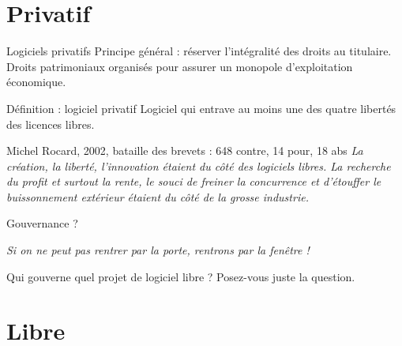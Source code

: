 \documentclass{beamer}
\begin{document}

\section{Privatif}


\begin{frame}{Logiciels privatifs}
  Principe général : réserver l'intégralité des droits au titulaire. Droits patrimoniaux organisés pour assurer un monopole d'exploitation économique.

  \begin{alertblock}{Définition : logiciel privatif}
    Logiciel qui entrave au moins une des quatre libertés des licences libres.    
  \end{alertblock}

\pause

  \begin{block}{Michel Rocard, 2002, bataille des brevets : 648 contre, 14 pour, 18 abs}
   \textit{ La création, la liberté, l'innovation étaient du côté des logiciels libres. La recherche du profit et surtout la rente, le souci de freiner la concurrence et d'étouffer le buissonnement extérieur étaient du côté de la grosse industrie.
}
  \end{block}
\end{frame}

\begin{frame}{Gouvernance ?}
  
\textit{Si on ne peut pas rentrer par la porte, rentrons par la fenêtre !}

Qui gouverne quel projet de logiciel libre ? Posez-vous juste la question.

\end{frame}



\section{Libre}
\end{document}
